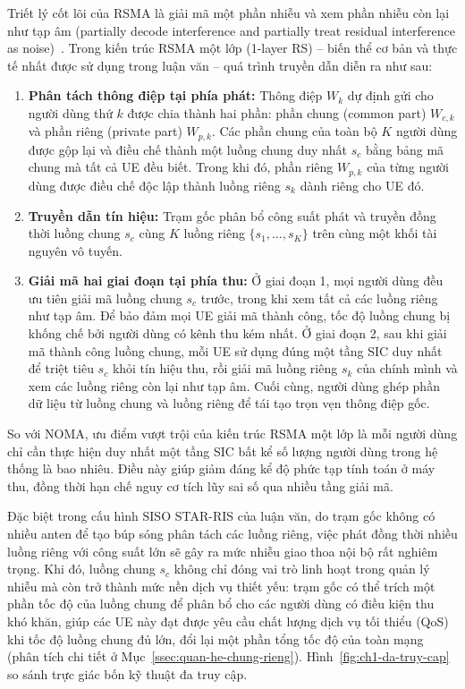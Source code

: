 Triết lý cốt lõi của RSMA là giải mã một phần nhiễu và xem phần nhiễu còn lại như tạp âm (partially
decode interference and partially treat residual interference as noise)~\cite{Mao2022RSMAFundamentals}.
Trong kiến trúc RSMA một lớp (1-layer RS) -- biến thể cơ bản và thực tế nhất được sử dụng trong luận văn
-- quá trình truyền dẫn diễn ra như sau:
\begin{enumerate}
\item \textbf{Phân tách thông điệp tại phía phát:} Thông điệp $W_k$ dự định gửi cho người dùng thứ $k$
  được chia thành hai phần: phần chung (common part) $W_{c,k}$ và phần riêng (private part) $W_{p,k}$. Các
  phần chung của toàn bộ $K$ người dùng được gộp lại và điều chế thành một luồng chung duy nhất $s_c$ bằng
  bảng mã chung mà tất cả UE đều biết. Trong khi đó, phần riêng $W_{p,k}$ của từng người dùng được điều chế
  độc lập thành luồng riêng $s_k$ dành riêng cho UE đó.
\item \textbf{Truyền dẫn tín hiệu:} Trạm gốc phân bổ công suất phát và truyền đồng thời luồng chung $s_c$
  cùng $K$ luồng riêng $\{s_1, \dots, s_K\}$ trên cùng một khối tài nguyên vô tuyến.
\item \textbf{Giải mã hai giai đoạn tại phía thu:} Ở giai đoạn 1, mọi người dùng đều ưu tiên giải mã luồng
  chung $s_c$ trước, trong khi xem tất cả các luồng riêng như tạp âm. Để bảo đảm mọi UE giải mã thành công,
  tốc độ luồng chung bị khống chế bởi người dùng có kênh thu kém nhất. Ở giai đoạn 2, sau khi giải mã thành
  công luồng chung, mỗi UE sử dụng đúng một tầng SIC duy nhất để triệt tiêu $s_c$ khỏi tín hiệu thu, rồi
  giải mã luồng riêng $s_k$ của chính mình và xem các luồng riêng còn lại như tạp âm. Cuối cùng, người dùng
  ghép phần dữ liệu từ luồng chung và luồng riêng để tái tạo trọn vẹn thông điệp gốc.
\end{enumerate}

So với NOMA, ưu điểm vượt trội của kiến trúc RSMA một lớp là mỗi người dùng chỉ cần thực hiện duy nhất một
tầng SIC bất kể số lượng người dùng trong hệ thống là bao nhiêu. Điều này giúp giảm đáng kể độ phức tạp
tính toán ở máy thu, đồng thời hạn chế nguy cơ tích lũy sai số qua nhiều tầng giải mã.

Đặc biệt trong cấu hình SISO STAR-RIS của luận văn, do trạm gốc không có nhiều anten để tạo búp sóng phân
tách các luồng riêng, việc phát đồng thời nhiều luồng riêng với công suất lớn sẽ gây ra mức nhiễu giao
thoa nội bộ rất nghiêm trọng. Khi đó, luồng chung $s_c$ không chỉ đóng vai trò linh hoạt trong quản lý
nhiễu mà còn trở thành mức nền dịch vụ thiết yếu: trạm gốc có thể trích một phần tốc độ của luồng chung
để phân bổ cho các người dùng có điều kiện thu khó khăn, giúp các UE này đạt được yêu cầu chất lượng dịch
vụ tối thiểu (QoS) khi tốc độ luồng chung đủ lớn, đổi lại một phần tổng tốc độ của toàn mạng (phân tích
chi tiết ở Mục~\ref{ssec:quan-he-chung-rieng}). Hình~\ref{fig:ch1-da-truy-cap} so sánh trực giác bốn kỹ
thuật đa truy cập.

